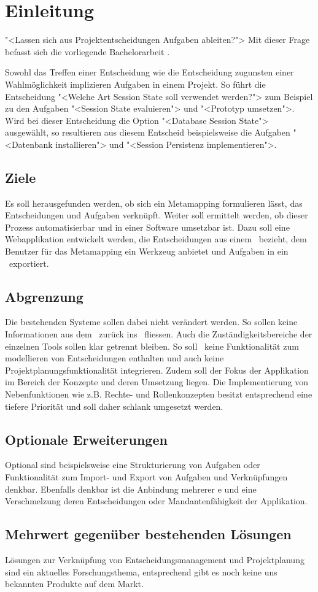 \chapter{Einleitung}
	"<Lassen sich aus Projektentscheidungen Aufgaben ableiten?">
	Mit dieser Frage befasst sich die vorliegende Bachelorarbeit \eeppi.
		
	Sowohl das Treffen einer Entscheidung wie die Entscheidung zugunsten einer Wahlmöglichkeit implizieren Aufgaben in einem Projekt.
	So führt die Entscheidung "<Welche Art Session State soll verwendet werden?"> zum Beispiel zu den Aufgaben
	"<Session State evaluieren"> und "<Prototyp umsetzen">.		
	Wird bei dieser Entscheidung die Option "<Database Session State"> ausgewählt,
	so resultieren aus diesem Entscheid beispielsweise die Aufgaben "<Datenbank installieren"> und "<Session Persistenz implementieren">.
	
	
	\section{Ziele}
	Es soll herausgefunden werden, ob sich ein Metamapping formulieren lässt,
	das Entscheidungen und Aufgaben verknüpft.
	Weiter soll ermittelt werden, ob dieser Prozess automatisierbar und in einer Software umsetzbar ist.
	Dazu soll eine Webapplikation entwickelt werden, die Entscheidungen aus einem \dks\ bezieht, 
	dem Benutzer für das Metamapping ein Werkzeug anbietet und Aufgaben in ein \ppt\ exportiert.
	
	
	\section{Abgrenzung}
	Die bestehenden Systeme sollen dabei nicht verändert werden. So sollen keine Informationen aus dem \ppt\ zurück ins \dks\ fliessen.
	Auch die Zuständigkeitsbereiche der einzelnen Tools sollen klar getrennt bleiben. So soll \eeppi\ keine Funktionalität zum modellieren von Entscheidungen enthalten und auch keine Projektplanungsfunktionalität integrieren.
	Zudem soll der Fokus der Applikation im Bereich der Konzepte und deren Umsetzung liegen. Die Implementierung von Nebenfunktionen wie z.B. Rechte- und Rollenkonzepten besitzt entsprechend eine tiefere Priorität und soll daher schlank umgesetzt werden.
	
	
	\section{Optionale Erweiterungen}
	Optional sind beispielsweise eine Strukturierung von Aufgaben oder Funktionalität zum Import- und Export von Aufgaben und Verknüpfungen denkbar.	
	Ebenfalls denkbar ist die Anbindung mehrerer \dks e und eine Verschmelzung deren Entscheidungen oder Mandantenfähigkeit der Applikation.
	
	
	\section{Mehrwert gegenüber bestehenden Lösungen}
	Lösungen zur Verknüpfung von Entscheidungsmanagement und Projektplanung sind ein aktuelles Forschungsthema, 
	entsprechend gibt es noch keine uns bekannten Produkte auf dem Markt.
	 		
		
	